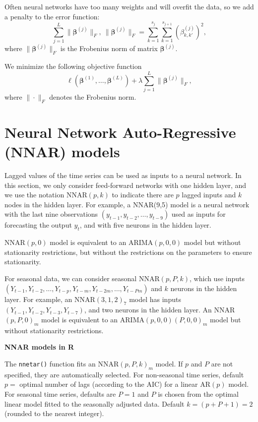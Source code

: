 \documentclass[]{book}
\begin{document}
Often neural networks have too many weights and will overfit the data,
so we add a penalty to the error function: \[
\sum_{j = 1}^{L} \|\boldsymbol{\beta}^{(j)}\|_F,~\|\boldsymbol{\beta}^{(j)}\|_F= \sum_{k=1}^{s_j} \sum_{k=1}^{s_{j+1}}(\beta^{(j)}_{k,k'})^2,
\] where \(\|\boldsymbol{\beta}^{(j)}\|_F\) is the Frobenius norm of
matrix \(\boldsymbol{\beta}^{(j)}\).

We minimize the following objective function \[
\ell(\boldsymbol{\beta}^{(1)}, \ldots, \boldsymbol{\beta}^{(L)}) + \lambda \sum_{j = 1}^{L} \|\boldsymbol{\beta}^{(j)}\|_F,
\] where \(\|\cdot\|_F\) denotes the Frobenius norm.

\section{Neural Network Auto-Regressive (NNAR)
models}\label{neural-network-auto-regressive-nnar-models}

Lagged values of the time series can be used as inputs to a neural
network. In this section, we only consider feed-forward networks with
one hidden layer, and we use the notation NNAR\((p,k)\) to indicate
there are \(p\) lagged inputs and \(k\) nodes in the hidden layer. For
example, a NNAR(9,5) model is a neural network with the last nine
observations \((y_{t-1}, y_{t-2}, \ldots, y_{t-9})\) used as inputs for
forecasting the output \(y_t\), and with five neurons in the hidden
layer.

NNAR\((p,0)\) model is equivalent to an ARIMA\((p,0,0)\) model but
without stationarity restrictions, but without the restrictions on the
parameters to ensure stationarity.

For seasonal data, we can consider seasonal NNAR\((p,P,k)\), which use
inputs
\((Y_{t-1},Y_{t-2},\ldots, Y_{t-p}, Y_{t-m}, Y_{t-2m},\ldots, Y_{t-Pm})\)
and \(k\) neurons in the hidden layer. For example, an
NNAR\((3,1,2)_{7}\) model has inputs
\((Y_{t-1},Y_{t-2}, Y_{t-3}, Y_{t-7})\), and two neurons in the hidden
layer. An NNAR\((p,P,0)_m\) model is equivalent to an
ARIMA\((p,0,0)(P,0,0)_m\) model but without stationarity restrictions.

\textbf{NNAR models in R}

The \texttt{nnetar()} function fits an NNAR\((p,P,k)_m\) model. If \(p\)
and \(P\) are not specified, they are automatically selected. For
non-seasonal time series, default \(p =\) optimal number of lags
(according to the AIC) for a linear AR\((p)\) model. For seasonal time
series, defaults are \(P = 1\) and \(P\) is chosen from the optimal
linear model fitted to the seasonally adjusted data. Default
\(k = (p + P + 1)=2\) (rounded to the nearest integer).
\end{document}
